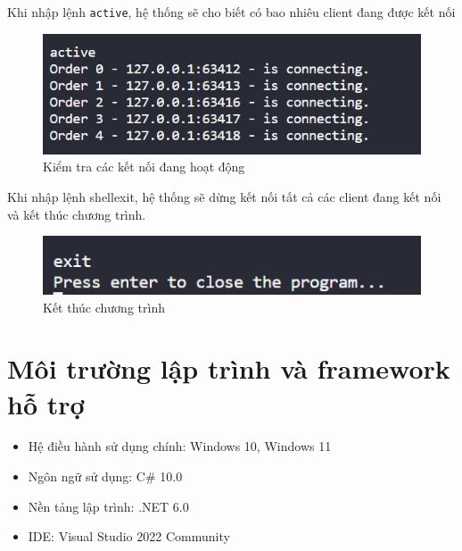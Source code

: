 \documentclass[14pt, a4paper]{extarticle}
\newcommand{\shell}[1]{\lstinline[language=bash, basicstyle=\color{orange!40!black}\large\ttfamily,
keywordstyle=\color{blue},
commentstyle=\color{green!50!black},]{#1}}
\begin{document}
Khi nhập lệnh \shell{active}, hệ thống sẽ cho biết có bao nhiêu client đang được kết nối
\begin{figure}[H]
    \begin{center}
        \includegraphics{PicGuide/Active.png}
        \caption{Kiểm tra các kết nối đang hoạt động}
    \end{center}
\end{figure}
Khi nhập lệnh shell{exit}, hệ thống sẽ dừng kết nối tất cả các client đang kết nối và kết thúc chương trình.
\begin{figure}[H]
    \begin{center}
        \includegraphics{PicGuide/Exit.png}
        \caption{Kết thúc chương trình}
    \end{center}
\end{figure}
\section{Môi trường lập trình và framework hỗ trợ}
\begin{itemize}
    \item Hệ điều hành sử dụng chính: Windows 10, Windows 11
    \item Ngôn ngữ sử dụng: C\# 10.0
    \item Nền tảng lập trình: .NET 6.0
    \item IDE: Visual Studio 2022 Community
\end{itemize}
\end{document}
